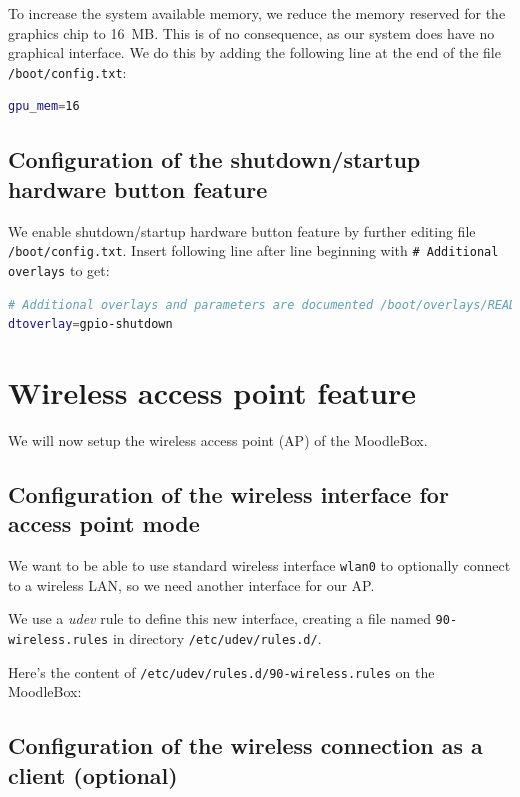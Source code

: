 \documentclass[12pt]{article}
\begin{document}
To increase the system available memory, we reduce the memory reserved for the graphics chip to 16~MB.
This is of no consequence, as our system does have no graphical interface.
We do this by adding the following line at the end of the file \lstinline{/boot/config.txt}:
\begin{lstlisting}[language=bash]
gpu_mem=16
\end{lstlisting}

\subsection{Configuration of the shutdown/startup hardware button feature}

We enable shutdown/startup hardware button feature by further editing file \lstinline{/boot/config.txt}.
Insert following line after line beginning with \lstinline{# Additional overlays} to get:
\begin{lstlisting}[language=bash]
# Additional overlays and parameters are documented /boot/overlays/README
dtoverlay=gpio-shutdown
\end{lstlisting}

\section{Wireless access point feature}

We will now setup the wireless access point (AP) of the MoodleBox.

\subsection{Configuration of the wireless interface for access point mode}

We want to be able to use standard wireless interface \lstinline{wlan0} to optionally connect to a wireless LAN, so we need another interface for our AP.

We use a \textsl{udev} rule to define this new interface, creating a file named \lstinline{90-wireless.rules} in directory \lstinline{/etc/udev/rules.d/}.

Here's the content of \lstinline{/etc/udev/rules.d/90-wireless.rules} on the MoodleBox:



\subsection{Configuration of the wireless connection as a client (optional)}
\end{document}
